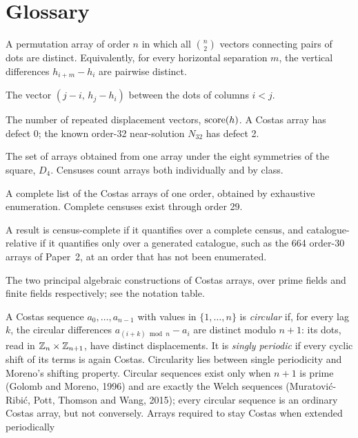 \section*{Glossary}
\begin{description}[style=nextline,leftmargin=0pt,itemsep=2pt]
\item[Costas array] A permutation array of order $n$ in which all $\binom{n}{2}$ vectors connecting
pairs of dots are distinct. Equivalently, for every horizontal separation $m$, the vertical
differences $h_{i+m}-h_i$ are pairwise distinct.
\item[Displacement] The vector $(j-i,\,h_j-h_i)$ between the dots of columns $i<j$.
\item[Defect, score] The number of repeated displacement vectors, $\operatorname{score}(h)$. A Costas array has
defect 0; the known order-32 near-solution $N_{32}$ has defect 2.
\item[Dihedral orbit, equivalence class] The set of arrays obtained from one array under the eight
symmetries of the square, $D_4$. Censuses count arrays both individually and by class.
\item[Census] A complete list of the Costas arrays of one order, obtained by exhaustive enumeration.
Complete censuses exist through order 29.
\item[Census-complete, catalogue-relative] A result is census-complete if it quantifies over a
complete census, and catalogue-relative if it quantifies only over a generated catalogue, such as
the 664 order-30 arrays of Paper~2, at an order that has not been enumerated.
\item[Welch and Golomb constructions] The two principal algebraic constructions of Costas arrays,
over prime fields and finite fields respectively; see the notation table.
\item[Circular and singly periodic sequences] A Costas sequence $a_0,\dots,a_{n-1}$ with values in
$\{1,\dots,n\}$ is \emph{circular} if, for every lag $k$, the circular differences
$a_{(i+k)\bmod n}-a_i$ are distinct modulo $n+1$: its dots, read in $\mathbb{Z}_n\times\mathbb{Z}_{n+1}$, have
distinct displacements. It is \emph{singly periodic} if every cyclic shift of its terms is again
Costas. Circularity lies between single periodicity and Moreno's shifting property. Circular
sequences exist only when $n+1$ is prime (Golomb and Moreno, 1996) and are exactly the Welch
sequences (Muratovi\'c-Ribi\'c, Pott, Thomson and Wang, 2015); every circular sequence is an
ordinary Costas array, but not conversely. Arrays required to stay Costas when extended periodically

\end{description}
